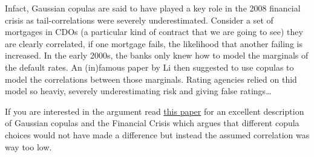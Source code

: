 \documentclass[11pt]{article}
\begin{document}
Infact, Gaussian copulas are said to have played a key role in the 2008
financial crisis as tail-correlations were severely underestimated.
Consider a set of mortgages in CDOs (a particular kind of contract that
we are going to see) they are clearly correlated, if one mortgage fails,
the likelihood that another failing is increased. In the early 2000s,
the banks only knew how to model the marginals of the default rates. An
(in)famous paper by Li then suggested to use copulas to model the
correlations between those marginals. Rating agencies relied on thid
model so heaviy, severely underestimating risk and giving false
ratings\ldots{}

If you are interested in the argument read
\href{http://samueldwatts.com/wp-content/uploads/2016/08/Watts-Gaussian-Copula_Financial_Crisis.pdf}{this paper}
for an excellent description of Gaussian copulas and the Financial
Crisis which argues that different copula choices would not have made a
difference but instead the assumed correlation was way too low.


    
    
    
\end{document}
